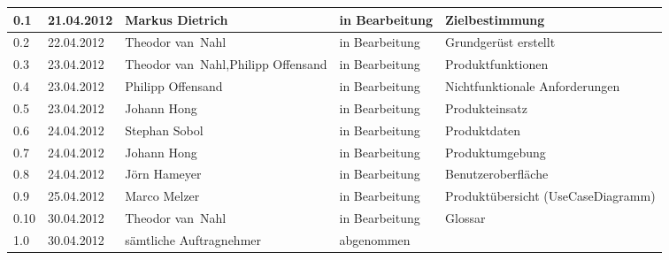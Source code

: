 \begin{longtable}{|m{1.78cm}|m{1.59cm}|m{2.86cm}|m{1.9cm}|m{5.25cm}|}
  0.1   &   21.04.2012     &   Markus Dietrich       &   in Bearbeitung    &  Zielbestimmung    \\       %
  \hline                                              %
  0.2   &   22.04.2012     &   Theodor van~Nahl   &   in Bearbeitung    &  Grundgerüst erstellt   \\       %
  \hline                                              %
  0.3   &   23.04.2012     &   Theodor van~Nahl,\newline Philipp \mbox{Offensand}   &   in Bearbeitung    &  Produktfunktionen   \\       %
  \hline                                              %
  0.4   &   23.04.2012     &   Philipp \mbox{Offensand}   &   in Bearbeitung    &  Nichtfunktionale Anforderungen   \\       %
  \hline                                              %
  0.5   &   23.04.2012     &   Johann Hong           &   in Bearbeitung    &  Produkteinsatz   \\       %
  \hline                                              %
  0.6   &   24.04.2012     &   Stephan Sobol         &   in Bearbeitung    &  Produktdaten  \\       %
  \hline                                              %
  0.7   &   24.04.2012     &   Johann Hong           &   in Bearbeitung    &  Produktumgebung   \\       %
  \hline                                              %
  0.8   &   24.04.2012     &   Jörn Hameyer          &   in Bearbeitung    &  Benutzeroberfläche   \\       %
  \hline                                              %
  0.9   &   25.04.2012     &   Marco Melzer           &   in Bearbeitung    &  Produktübersicht (UseCaseDiagramm)   \\       %
  \hline                                              %
  0.10 &   30.04.2012     &   Theodor van~Nahl   &   in Bearbeitung    &  Glossar   \\       %
  \hline                                              %
  1.0   &   30.04.2012     &   sämtliche Auftragnehmer   &   abgenommen    &     \\       %
  \hline                                              %
\end{longtable}



